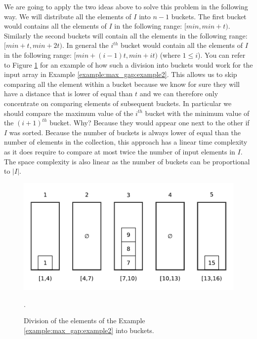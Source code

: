 We are going to apply the two ideas above to solve this problem in the following way. We will
distribute all the elements of $I$ into $n-1$ buckets. The first bucket would contains all the
elements of $I$ in the following range: $[min, min + t)$. Similarly the second buckets will contain
all the elements in the following range: $[min + t, min + 2t)$. In general the $i^{th}$ bucket
would contain all the elements of $I$ in the following range: $[min + (i-1)t, min+it)$ (where $ 1
\leq i$). You can refer to Figure \ref{fig:max_gap:bucketing_example2} for an example of how such a
division into buckets would work for the input array in Example \ref{example:max_gap:example2}. This
allows us to skip comparing all the element within a bucket because we know for sure they will have
a distance that is lower of equal than $t$ and we can therefore only concentrate on comparing
elements of subsequent buckets. In particular we should compare the maximum value of the $i^{th}$
bucket with the minimum value of the $(i+1)^{th}$ bucket. Why? Because they would appear one next to
the other if $I$ was sorted. Because the number of buckets is always lower of equal than the number
of elements in the collection, this approach has a linear time complexity as it does require to
compare at most twice the number of input elements in $I$. The space complexity is also linear as
the number of buckets can be proportional to $|I|$.
\begin{figure}
	\centering
	\includegraphics[width=\textwidth]{sources/max_gap/images/bucketing_example1}
	\caption{Division of the elements of the Example \ref{example:max_gap:example2} into buckets.}.
	\label{fig:max_gap:bucketing_example2}
\end{figure}


